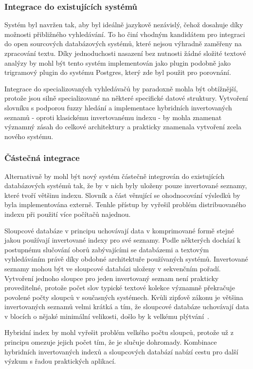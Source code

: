 \documentclass[11pt,letterpaper,oneside,openright]{book}
\begin{document}
\subsubsection{Integrace do existujících systémů}
Systém byl navržen tak, aby byl ideálně jazykově nezávislý, čehož dosahuje díky
možnosti přibližného vyhledávání. To ho činí vhodným kandidátem pro integraci
do open sourcových databázových systémů, které nejsou výhradně zaměřeny na
zpracování textu. Díky jednoduchosti nasazení bez nutnosti žádné složité
textové analýzy by mohl být tento systém implementován jako plugin podobně
jako trigramový plugin do systému Postgres, který zde byl použit pro
porovnání.

Integrace do specializovaných vyhledávačů by paradoxně mohla být obtížnější,
protože jsou silně specializované na některé specifické datové struktury.
Vytvoření slovníku s podporou fuzzy hledání a implementace hybridních
invertovaných seznamů - oproti klasickému invertovanému indexu - by mohla
znamenat významný zásah do celkové architektury a prakticky znamenala vytvoření
zcela nového systému.

\subsubsection{Částečná integrace}
Alternativně by mohl být nový systém částečně integrován do existujících
databázových systémů tak, že by v nich byly uloženy pouze invertované seznamy,
které tvoří většinu indexu. Slovník a část věnující se ohodnocování výsledků by
byla implementována externě. Tenhle přístup by vyřešil problém distribuovaného
indexu při použití více počítačů najednou.

Sloupcové databáze v principu uchovávají data v komprimované formě stejné jakou
používají invertované indexy pro své seznamy. Podle některých dochází k
postupnému slučování oborů zabývajícími se databázemi a textovým vyhledáváním
právě díky obdobné architektuře používaných systémů. Invertované seznamy mohou
být ve sloupcové databázi uloženy v sekvenčním pořadí. Vytvoření jednoho
sloupce pro jeden invertovaný seznam není prakticky proveditelné, protože počet
slov typické textové kolekce významně překračuje povolené počty sloupců v
současných systémech. Kvůli zipfově zákonu je většina invertovaných seznamů
velmi krátká a tím, že sloupcové databáze uchovávají data v blocích o nějaké
minimální velikosti, došlo by k velkému plýtvání~\cite{Bjorklund_aconfluence}.

Hybridní index by mohl vyřešit problém velkého počtu sloupců, protože už z
principu omezuje jejich počet tím, že je slučuje dohromady. Kombinace
hybridních invertovaných indexů a sloupcových databází nabízí cestu pro další
výzkum s řadou praktických aplikací.
\end{document}
